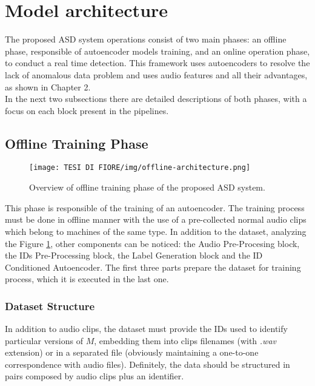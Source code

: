 \section{Model architecture}
The proposed ASD system operations consist of two main phases: an offline phase, responsible of autoencoder models training, and an online operation phase, to conduct a real time detection. This framework uses autoencoders to resolve the lack of anomalous data problem and uses audio features and all their advantages, as shown in Chapter 2.\\
In the next two subsections there are detailed descriptions of both phases, with a focus on each block present in the pipelines.
\subsection{Offline Training Phase}
\begin{figure}[ht]
\texttt{[image: TESI DI FIORE/img/offline-architecture.png]}
\centering
\caption{Overview of offline training phase of the proposed ASD system.}
\label{offline-asd-system}
\end{figure}
This phase is responsible of the training of an autoencoder. The training process must be done in offline manner with the use of a pre-collected normal audio clips which belong to machines of the same type. In addition to the dataset, analyzing the Figure \ref{offline-asd-system}, other components can be noticed: the Audio Pre-Procesing block, the IDs Pre-Processing block, the Label Generation block and the ID Conditioned Autoencoder. The first three parts prepare the dataset for training process, which it is executed in the last one.
\subsubsection{Dataset Structure}
In addition to audio clips, the dataset must provide the IDs used to identify particular versions of $M$, embedding them into clips filenames (with \textit{.wav} extension) or in a separated file (obviously maintaining a one-to-one correspondence with audio files). Definitely, the data should be structured in pairs composed by audio clips plus an identifier.
